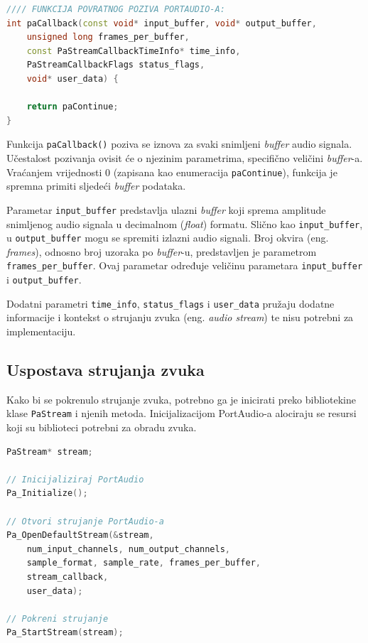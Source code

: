 \documentclass[times, utf8, diplomski, numeric]{fer}
\begin{document}
\begin{lstlisting}[language=C++, frame=single]
//// FUNKCIJA POVRATNOG POZIVA PORTAUDIO-A:
int paCallback(const void* input_buffer, void* output_buffer,
	unsigned long frames_per_buffer,
	const PaStreamCallbackTimeInfo* time_info,
	PaStreamCallbackFlags status_flags,
	void* user_data) {
	
	return paContinue;
}
\end{lstlisting}

Funkcija \lstinline[basicstyle=\ttfamily]|paCallback()| poziva se iznova za svaki snimljeni \textit{buffer} audio signala. Učestalost pozivanja ovisit će o njezinim parametrima, specifično veličini \textit{buffer}-a. Vraćanjem vrijednosti 0 (zapisana kao enumeracija \lstinline[basicstyle=\ttfamily]|paContinue|), funkcija je spremna primiti sljedeći \textit{buffer} podataka.

Parametar \lstinline[basicstyle=\ttfamily]|input_buffer| predstavlja ulazni \textit{buffer} koji sprema amplitude snimljenog audio signala u decimalnom (\textit{float}) formatu. Slično kao \lstinline[basicstyle=\ttfamily]|input_buffer|, u \lstinline[basicstyle=\ttfamily]|output_buffer| mogu se spremiti izlazni audio signali. Broj okvira (eng. \textit{frames}), odnosno broj uzoraka po \textit{buffer}-u, predstavljen je parametrom \lstinline[basicstyle=\ttfamily]|frames_per_buffer|. Ovaj parametar određuje veličinu parametara \lstinline[basicstyle=\ttfamily]|input_buffer| i \lstinline[basicstyle=\ttfamily]|output_buffer|.

Dodatni parametri \lstinline[basicstyle=\ttfamily]|time_info|, \lstinline[basicstyle=\ttfamily]|status_flags| i \lstinline[basicstyle=\ttfamily]|user_data| pružaju dodatne informacije i kontekst o strujanju zvuka (eng. \textit{audio stream}) te nisu potrebni za implementaciju.

\subsection{Uspostava strujanja zvuka}
%
Kako bi se pokrenulo strujanje zvuka, potrebno ga je inicirati preko bibliotekine klase \lstinline[basicstyle=\ttfamily]|PaStream| i njenih metoda. Inicijalizacijom PortAudio-a alociraju se resursi koji su biblioteci potrebni za obradu zvuka.

\begin{lstlisting}[language=C++, frame=single]
PaStream* stream;

// Inicijaliziraj PortAudio
Pa_Initialize();
	
// Otvori strujanje PortAudio-a
Pa_OpenDefaultStream(&stream,
	num_input_channels, num_output_channels, 
	sample_format, sample_rate, frames_per_buffer,
	stream_callback,
	user_data);
	
// Pokreni strujanje
Pa_StartStream(stream);
\end{lstlisting}
\end{document}
